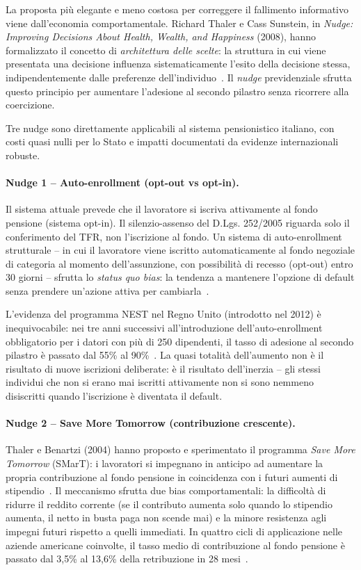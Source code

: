 La proposta più elegante e meno costosa per correggere il fallimento
informativo viene dall'economia comportamentale. Richard Thaler e Cass
Sunstein, in \emph{Nudge: Improving Decisions About Health, Wealth, and
Happiness} (2008), hanno formalizzato il concetto di \emph{architettura
delle scelte}: la struttura in cui viene presentata una decisione influenza
sistematicamente l'esito della decisione stessa, indipendentemente dalle
preferenze dell'individuo~\cite{ThalerSunstein2008}. Il \emph{nudge}
previdenziale sfrutta questo principio per aumentare l'adesione al secondo
pilastro senza ricorrere alla coercizione.

Tre nudge sono direttamente applicabili al sistema pensionistico italiano,
con costi quasi nulli per lo Stato e impatti documentati da evidenze
internazionali robuste.

\paragraph{Nudge 1 -- Auto-enrollment (opt-out vs opt-in).}
Il sistema attuale prevede che il lavoratore si iscriva attivamente al
fondo pensione (sistema opt-in). Il silenzio-assenso del D.Lgs. 252/2005
riguarda solo il conferimento del TFR, non l'iscrizione al fondo. Un
sistema di auto-enrollment strutturale -- in cui il lavoratore viene
iscritto automaticamente al fondo negoziale di categoria al momento
dell'assunzione, con possibilità di recesso (opt-out) entro 30 giorni --
sfrutta lo \emph{status quo bias}: la tendenza a mantenere l'opzione
di default senza prendere un'azione attiva per cambiarla~\cite{ThalerSunstein2008}.

L'evidenza del programma NEST nel Regno Unito (introdotto nel 2012) è
inequivocabile: nei tre anni successivi all'introduzione dell'auto-enrollment
obbligatorio per i datori con più di 250 dipendenti, il tasso di adesione
al secondo pilastro è passato dal 55\% al 90\%~\cite{DWP2017}.
La quasi totalità dell'aumento non è il risultato di nuove iscrizioni
deliberate: è il risultato dell'inerzia -- gli stessi individui che non
si erano mai iscritti attivamente non si sono nemmeno disiscritti quando
l'iscrizione è diventata il default.

\paragraph{Nudge 2 -- Save More Tomorrow (contribuzione crescente).}
Thaler e Benartzi (2004) hanno proposto e sperimentato il programma
\emph{Save More Tomorrow} (SMarT): i lavoratori si impegnano in anticipo
ad aumentare la propria contribuzione al fondo pensione in coincidenza con
i futuri aumenti di stipendio~\cite{ThalerBenartzi2004}. Il meccanismo
sfrutta due bias comportamentali: la difficoltà di ridurre il reddito
corrente (se il contributo aumenta solo quando lo stipendio aumenta, il
netto in busta paga non scende mai) e la minore resistenza agli impegni
futuri rispetto a quelli immediati. In quattro cicli di applicazione nelle
aziende americane coinvolte, il tasso medio di contribuzione al fondo
pensione è passato dal 3,5\% al 13,6\% della retribuzione in 28
mesi~\cite{ThalerBenartzi2004}.

